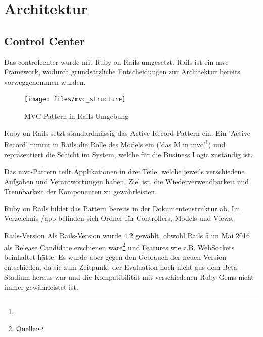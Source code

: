 \section{Architektur}

\subsection*{Control Center}

Das \gls{controlcenter} wurde mit Ruby on Rails umgesetzt. Rails ist ein \gls{mvc}-Framework, wodurch grundsätzliche Entscheidungen zur Architektur bereits vorweggenommen wurden.

\begin{figure}[H]
	\centering
	\texttt{[image: files/mvc\_structure]}
	\caption{MVC-Pattern in Rails-Umgebung}
	\label{fig:tec:mvc}
\end{figure}

Ruby on Rails setzt standardmässig das Active-Record-Pattern ein. Ein 'Active Record' nimmt in Rails die Rolle des Models ein ('das M in \gls{mvc}'\footnote{}) und repräsentiert die Schicht im System, welche für die Business Logic zuständig ist.

Das \gls{mvc}-Pattern teilt Applikationen in drei Teile, welche jeweils verschiedene Aufgaben und Verantwortungen haben. Ziel ist, die Wiederverwendbarkeit und Trennbarkeit der Komponenten zu gewährleisten.

Ruby on Rails bildet das Pattern bereits in der Dokumentenstruktur ab. Im Verzeichnis /app befinden sich Ordner für Controllers, Models und Views.

\begin{decision}{Rails-Version}
Als Rails-Version wurde 4.2 gewählt, obwohl Rails 5 im Mai 2016 als Release Candidate erschienen wäre\footnote{Quelle: } und Features wie z.B. WebSockets beinhaltet hätte. Es wurde aber gegen den Gebrauch der neuen Version entschieden, da sie zum Zeitpunkt der Evaluation noch nicht aus dem Beta-Stadium heraus war und die Kompatibilität mit verschiedenen Ruby-Gems nicht immer gewährleistet ist.
\end{decision}

